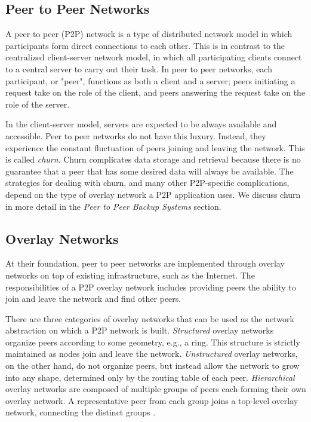 \documentclass[12pt]{report}
\begin{document}
\subsection{Peer to Peer Networks}

A peer to peer (P2P) network is a type of distributed network model in which participants form direct connections to each other. This is in contrast to the centralized client-server network model, in which all participating clients connect to a central server to carry out their task. In peer to peer networks, each participant, or "peer", functions as both a client and a server; peers initiating a request take on the role of the client, and peers answering the request take on the role of the server.

In the client-server model, servers are expected to be always available and accessible. Peer to peer networks do not have this luxury. Instead, they experience the constant fluctuation of peers joining and leaving the network. This is called \textit{churn}. Churn complicates data storage and retrieval because there is no guarantee that a peer that has some desired data will always be available. The strategies for dealing with churn, and many other P2P-specific complications, depend on the type of overlay network a P2P application uses. We discuss churn in more detail in the \textit{Peer to Peer Backup Systems} section.

\subsection{Overlay Networks}

At their foundation, peer to peer networks are implemented through overlay networks on top of existing infrastructure, such as the Internet. The responsibilities of a P2P overlay network includes providing peers the ability to join and leave the network and find other peers. 

There are three categories of overlay networks that can be used as the network abstraction on which a P2P network is built. \textit{Structured} overlay networks organize peers according to some geometry, e.g., a ring. This structure is strictly maintained as nodes join and leave the network. \textit{Unstructured} overlay networks, on the other hand, do not organize peers, but instead allow the network to grow into any shape, determined only by the routing table of each peer. \textit{Hierarchical} overlay networks are composed of multiple groups of peers each forming their own overlay network. A representative peer from each group joins a top-level overlay network, connecting the distinct groups \cite{p2pSurvey}. 
\end{document}
